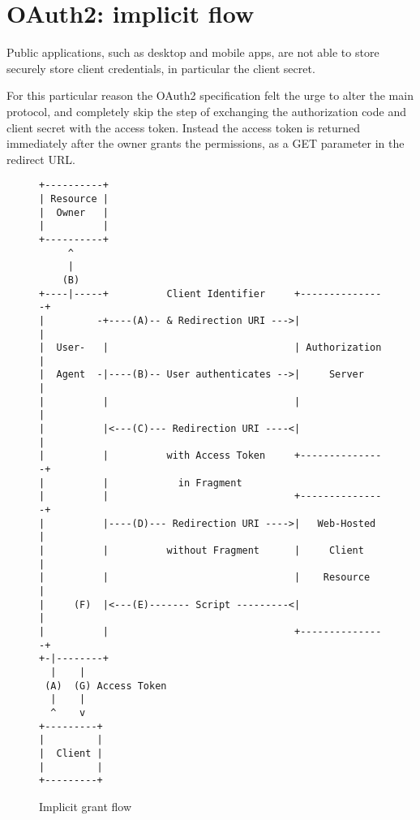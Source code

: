 \section{OAuth2: implicit flow}
\label{sec:implicit}
Public applications, such as desktop and mobile apps, are not able to store
securely store client credentials, in particular the client secret.

For this particular reason the OAuth2 specification felt the urge to alter the
main protocol, and completely skip the step of exchanging the authorization code
and client secret with the access token.
Instead the access token is returned immediately after the owner grants the
permissions, as a GET parameter in the redirect URL.

\begin{figure}[h]
    \centering
    \begin{BVerbatim}
+----------+
| Resource |
|  Owner   |
|          |
+----------+
     ^
     |
    (B)
+----|-----+          Client Identifier     +---------------+
|         -+----(A)-- & Redirection URI --->|               |
|  User-   |                                | Authorization |
|  Agent  -|----(B)-- User authenticates -->|     Server    |
|          |                                |               |
|          |<---(C)--- Redirection URI ----<|               |
|          |          with Access Token     +---------------+
|          |            in Fragment
|          |                                +---------------+
|          |----(D)--- Redirection URI ---->|   Web-Hosted  |
|          |          without Fragment      |     Client    |
|          |                                |    Resource   |
|     (F)  |<---(E)------- Script ---------<|               |
|          |                                +---------------+
+-|--------+
  |    |
 (A)  (G) Access Token
  |    |
  ^    v
+---------+
|         |
|  Client |
|         |
+---------+
\end{BVerbatim}
    \caption{Implicit grant flow \cite{ietf-oauth}}
    \label{fig:authorization-implicit-grant-flow}
\end{figure}


